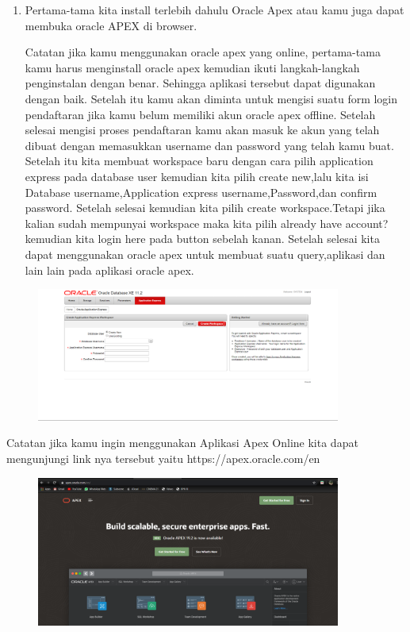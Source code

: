 \documentclass{article}
\begin{document}
\begin{enumerate}
    \item Pertama-tama kita install terlebih dahulu Oracle Apex atau kamu juga dapat membuka oracle APEX di browser.
\par Catatan jika kamu menggunakan oracle apex yang online, pertama-tama kamu harus menginstall oracle apex kemudian ikuti langkah-langkah penginstalan dengan benar. Sehingga aplikasi tersebut dapat digunakan dengan baik. Setelah itu kamu akan diminta untuk mengisi suatu form login pendaftaran jika kamu belum memiliki akun oracle apex offline. Setelah selesai mengisi proses pendaftaran kamu akan masuk ke akun yang telah dibuat dengan memasukkan username dan password yang telah kamu buat. Setelah itu kita membuat workspace baru dengan cara pilih application express pada database user kemudian kita pilih create new,lalu kita isi Database username,Application express username,Password,dan confirm password. Setelah selesai kemudian kita pilih create workspace.Tetapi jika kalian sudah mempunyai workspace maka kita pilih already have account? kemudian kita login here pada button sebelah kanan. Setelah selesai kita dapat menggunakan oracle apex untuk membuat suatu query,aplikasi dan lain lain pada aplikasi oracle apex.
\end{enumerate}
\begin{figure} [h]
\centerline{\includegraphics[width=10cm]{figure/oracle.PNG}}
\end{figure}
\newpage \par Catatan jika kamu ingin menggunakan Aplikasi Apex Online kita dapat mengunjungi link nya tersebut yaitu https://apex.oracle.com/en
\begin{figure} [h]
\centerline{\includegraphics[width=10cm]{figure/apex1.PNG}}
\end{figure}
\end{document}
